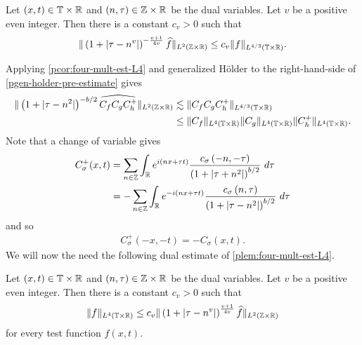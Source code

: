 %
%
%
%
%
%
%
%
\begin{lemma}
  \label{plem:four-mult-est-L4}
  Let $(x, t) \in \mathbb{T} \times \mathbb{R} $ and $(n, \tau) \in \mathbb{Z} \times \mathbb{R}$ be 
  the dual variables. Let $v$ be a positive even integer. Then there is a 
  constant $c_v > 0$ such that
%
%
\begin{equation}
  \label{pfour-mult-est-L4*}
  \begin{split}
    \| \left( 1 + | \tau - n^v | 
    \right)^{-\frac{v+1}{4v}}
    \widehat{f}\|_{L^2(\mathbb{Z} \times \mathbb{R})} \le c_v \|f \|_{L^{4/3}( \mathbb{T} \times \mathbb{R})}.
  \end{split}
\end{equation}
%
%
\end{lemma}
%
%
Applying \cref{pcor:four-mult-est-L4} and generalized H\"{o}lder to the 
right-hand-side of \eqref{pgen-holder-pre-estimate} gives
%
%
\begin{equation}
  \label{pgen-holder-piece-1}
  \begin{split}
    \|\left( 1 + | \tau - n^{2} | \right)^{-b/2} \widehat{C_f C_{ 
    g } C^+_{h}}\|_{L^2(\mathbb{Z} \times \mathbb{R})}
    & \lesssim  \|C_f C_{g} C^+_{h} \|_{L^{4/3}(\mathbb{T} \times \mathbb{R})}
    \\
    & \le \|C_f \|_{L^4(\mathbb{T} \times \mathbb{R})} \|C_{g}\|_{L^4(\mathbb{T} \times \mathbb{R})} 
    \|C^+_{h}\|_{L^4(\mathbb{T} \times \mathbb{R})}.
  \end{split}
\end{equation}
%
%
Note that a change of variable gives
%
%
\begin{equation*}
  \begin{split}
    C_\sigma^+(x, t)
    & = \sum_{n \in \mathbb{Z}} \int_{\mathbb{R}} e^{i(nx +  \tau t)} \frac{c_\sigma\left( -n, -\tau \right)}{\left( 
    1 + | \tau + n^{2} | \right)^{b/2}} \ d \tau
    \\
    & = - \sum_{n \in \mathbb{Z}} \int_{\mathbb{R}} e^{-i(nx +   \tau t )}
    \frac{c_\sigma\left( n, \tau \right)}{\left( 
    1 + | \tau - n^{2} | \right)^{b/2}} \ d \tau
  \end{split}
\end{equation*}
%
%
and so
%
%
\begin{equation*}
  \begin{split}
    C_\sigma^+(-x, -t) = -C_\sigma(x, t).
  \end{split}
\end{equation*}
%
%
We will now the need the following dual estimate of
\cref{plem:four-mult-est-L4}.
%
\begin{corollary}
  \label{pcor:four-mult-est-L4}
  Let $(x, t) \in \mathbb{T} \times \mathbb{R} $ and $(n, \tau) \in \mathbb{Z} \times \mathbb{R}$ be 
  the dual variables. Let $v$ be a positive even integer. Then there is a 
  constant $c_v > 0$ such that
%
%
\begin{equation}
  \label{pfour-mult-est-L4}
  \begin{split}
    \|f\|_{L^4(\mathbb{T} \times \mathbb{R})} \le c_v \|\left( 1 + | \tau - n^v | 
    \right)^\frac{v+1}{4v} \widehat{f} \|_{L^2( \mathbb{Z} \times \mathbb{R})}
  \end{split}
\end{equation}
for every test function $f(x, t)$. 
%
%
%
%
\end{corollary}
